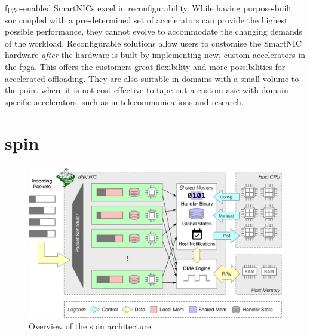\ac{fpga}-enabled SmartNICs excel in reconfigurability.  While having purpose-built \ac{soc} coupled with a pre-determined set of accelerators can provide the highest possible performance, they cannot evolve to accommodate the changing demands of the workload.  Reconfigurable solutions allow users to customise the SmartNIC hardware \emph{after} the hardware is built by implementing new, custom accelerators in the \ac{fpga}.  This offers the customers great flexibility and more possibilities for accelerated offloading.  They are also suitable in domains with a small volume to the point where it is not cost-effective to tape out a custom \ac{asic} with domain-specific accelerators, such as in telecommunications and research.

\section{\acs{spin}} \label{sec:background-spin}

\begin{figure}[tp]
    \centering
    \includegraphics[width=\textwidth]{figures/spin-arch.pdf}
    \caption{Overview of the \ac{spin} architecture.}
    \label{fig:spin-arch}
\end{figure}

